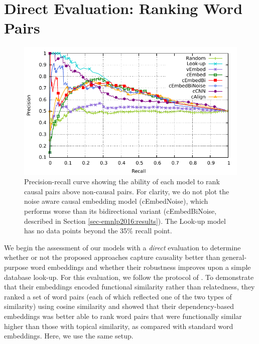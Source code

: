 
\section{Direct Evaluation: Ranking Word Pairs}
\label{sec-emnlp2016:directeval}

\begin{figure}[th!]
\begin{center}
\includegraphics[width=\textwidth]{mainmatter/emnlp2016-causal/direct2.pdf} %
\caption{{Precision-recall curve showing the ability of each model to rank causal pairs above non-causal pairs. For clarity, we do not plot the noise aware causal embedding model (cEmbedNoise), which performs worse than its bidirectional variant (cEmbedBiNoise, described in Section \ref{sec-emnlp2016:results}). The Look-up model has no data points beyond the 35\% recall point.}}
\label{fig:rpcurve_all}
\end{center}
\end{figure}

We begin the assessment of our models with a {\em direct} evaluation to determine whether or not the proposed approaches capture causality better than general-purpose word embeddings and whether their robustness improves upon a simple database look-up.
For this evaluation, we follow the protocol of \citet{levy2014dependency}.  
To demonstrate that their embeddings encoded functional similarity rather than relatedness, they ranked a set of word pairs (each of which reflected one of the two types of similarity) using cosine similarity and showed that their dependency-based embeddings was better able to rank word pairs that were functionally similar higher than those with topical similarity, as compared with standard word embeddings.  Here, we use the same setup. 
 
